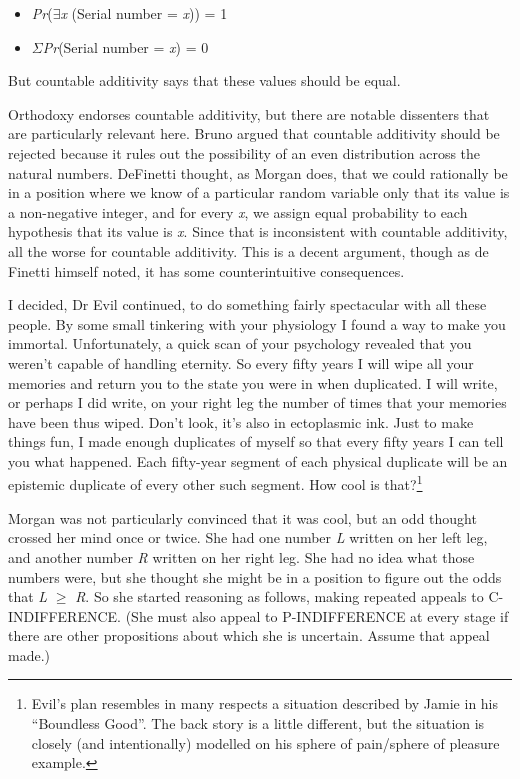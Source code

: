 \begin{itemize}
\item \textit{Pr}(${\exists}$\textit{x} (Serial number = \textit{x})) = 1
\item ${\Sigma}$\textit{Pr}(Serial number = \textit{x}) = 0 
\end{itemize}

\noindent But countable additivity says that these values should be equal.

Orthodoxy endorses countable additivity, but there are notable dissenters that are particularly relevant here. Bruno \citet{deFinetti1974} argued that countable additivity should be rejected because it rules out the possibility of an even distribution across the natural numbers. DeFinetti thought, as Morgan does, that we could rationally be in a position where we know of a particular random variable only that its value is a non-negative integer, and for every \textit{x}, we assign equal probability to each hypothesis that its value is \textit{x}. Since that is inconsistent with countable additivity, all the worse for countable additivity. This is a decent argument, though as de Finetti himself noted, it has some counterintuitive consequences.

I decided, Dr Evil continued, to do something fairly spectacular with all these people. By some small tinkering with your physiology I found a way to make you immortal. Unfortunately, a quick scan of your psychology revealed that you weren't capable of handling eternity. So every fifty years I will wipe all your memories and return you to the state you were in when duplicated. I will write, or perhaps I did write, on your right leg the number of times that your memories have been thus wiped. Don't look, it's also in ectoplasmic ink. Just to make things fun, I made enough duplicates of myself so that every fifty years I can tell you what happened. Each fifty-year segment of each physical duplicate will be an epistemic duplicate of every other such segment. How cool is that?\footnote{Evil's plan resembles in many respects a situation described by Jamie \citeauthor{Dreier2001} in his ``Boundless Good''. The back story is a little different, but the situation is closely (and intentionally) modelled on his sphere of pain/sphere of pleasure example.}

Morgan was not particularly convinced that it was cool, but an odd thought crossed her mind once or twice. She had one number \textit{L} written on her left leg, and another number \textit{R} written on her right leg. She had no idea what those numbers were, but she thought she might be in a position to figure out the odds that \textit{L} ${\geq}$ \textit{R}. So she started reasoning as follows, making repeated appeals to C-INDIFFERENCE. (She must also appeal to P\nobreakdash-INDIFFERENCE at every stage if there are other propositions about which she is uncertain. Assume that appeal made.)

